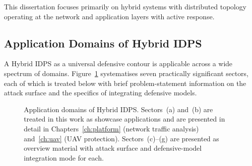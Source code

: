 This dissertation focuses primarily on hybrid systems with
distributed topology operating at the network and application layers
with active response.

\subsection{Application Domains of Hybrid IDPS}
\label{subsec:idps_sectors}

A Hybrid IDPS as a universal defensive contour is applicable across
a wide spectrum of domains. Figure~\ref{fig:orga_apps_idps}
systematises seven practically significant sectors, each of which is
treated below with brief problem-statement information on the attack
surface and the specifics of integrating defensive models.

\begin{figure}[htbp]
\centering
{}
\caption{Application domains of Hybrid IDPS. Sectors~(a) and~(b)
are treated in this work as showcase applications and are presented
in detail in Chapters~\ref{ch:platform} (network traffic analysis)
and~\ref{ch:uav} (UAV protection). Sectors~(c)--(g) are presented as
overview material with attack surface and defensive-model
integration mode for each.}
\label{fig:orga_apps_idps}
\end{figure}

